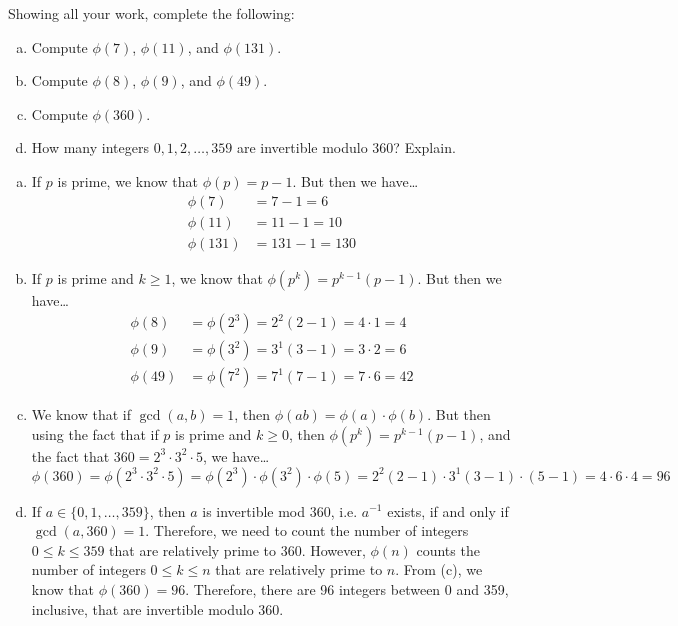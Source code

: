 \documentclass[11pt,letterpaper]{article}
\begin{document}
\newpage



 Showing all your work, complete the following: 
	\begin{enumerate}[(a)]
	\item Compute $\phi(7)$, $\phi(11)$, and $\phi(131)$.
	\item Compute $\phi(8)$, $\phi(9)$, and $\phi(49)$. 
	\item Compute $\phi(360)$.
	\item How many integers $0, 1, 2, \ldots, 359$ are invertible modulo 360? Explain. 
	\end{enumerate} \pspace

\sol 
\begin{enumerate}[(a)]
\item If $p$ is prime, we know that $\phi(p)= p - 1$. But then we have\dots
	\[
	\begin{aligned}
	\phi(7)&= 7 - 1= 6 \\
	\phi(11)&= 11 - 1= 10 \\
	\phi(131)&= 131 - 1= 130 
	\end{aligned}
	\]

\item If $p$ is prime and $k \geq 1$, we know that $\phi(p^k)= p^{k - 1} (p - 1)$. But then we have\dots
	\[
	\begin{aligned}
	\phi(8)&= \phi(2^3)= 2^2(2 - 1)= 4 \cdot 1= 4 \\
	\phi(9)&= \phi(3^2)= 3^1(3 - 1)= 3 \cdot 2= 6 \\
	\phi(49)&= \phi(7^2)= 7^1(7 - 1)= 7 \cdot 6= 42
	\end{aligned}
	\]

\item We know that if $\gcd(a, b)= 1$, then $\phi(ab)= \phi(a) \cdot \phi(b)$. But then using the fact that if $p$ is prime and $k \geq 0$, then $\phi(p^k)= p^{k - 1} (p - 1)$, and the fact that $360= 2^3 \cdot 3^2 \cdot 5$, we have\dots
	\[
	\phi(360)= \phi(2^3 \cdot 3^2 \cdot 5)= \phi(2^3) \cdot \phi(3^2) \cdot \phi(5)= 2^2(2 - 1) \cdot 3^1(3 - 1) \cdot (5 - 1)= 4 \cdot 6 \cdot 4= 96
	\]

\item If $a \in \{ 0, 1, \ldots, 359 \}$, then $a$ is invertible mod 360, i.e. $a^{-1}$ exists, if and only if $\gcd(a, 360)= 1$. Therefore, we need to count the number of integers $0 \leq k \leq 359$ that are relatively prime to 360. However, $\phi(n)$ counts the number of integers $0 \leq k \leq n$ that are relatively prime to $n$. From (c), we know that $\phi(360)= 96$. Therefore, there are 96 integers between 0 and 359, inclusive, that are invertible modulo 360. 
\end{enumerate}
\end{document}
